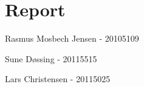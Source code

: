 \section{Report}

Rasmus Mosbech Jensen - 20105109

Sune D\o ssing - 20115515 

Lars Christensen - 20115025






